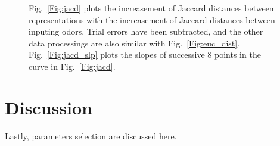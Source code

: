 \documentclass[12pt, a4paper]{article}
\begin{document}
\begin{figure}[htbp]\centering
{}
\hspace{0.5cm}
\caption[short~Title~Here]{\label{Fig:jac_dist} \small Fig.~\ref{Fig:jacd} plots the increasement of Jaccard distances between representations with the increasement of Jaccard distances between inputing odors. Trial errors have been subtracted, and the other data processings are also similar with Fig.~\ref{Fig:euc_dist}. Fig.~\ref{Fig:jacd_slp} plots the slopes of successive 8 points in the curve in Fig.~\ref{Fig:jacd}.}
\end{figure}





\section{Discussion} \label{Sect:discussion}

Lastly, parameters selection are discussed here.



\end{document}
